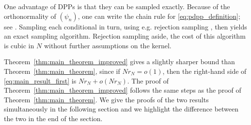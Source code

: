 \documentclass[twoside,11pt]{book}
\newtheorem{theorem}{Theorem}
\numberwithin{theorem}{chapter}
\numberwithin{definition}{chapter}
\numberwithin{proposition}{chapter}
\numberwithin{corollary}{chapter}
\numberwithin{example}{chapter}
\numberwithin{lemma}{chapter}
\begin{document}


One advantage of DPPs is that they can be sampled exactly. Because of the orthonormality of $(\psi_n)$, one can write the chain rule for \eqref{eq:pdpp_definition}; see \cite{HoKrPeVi06}. Sampling each conditional in turn, using e.g. rejection sampling \cite{RoCa04}, then yields an exact sampling algorithm. Rejection sampling aside, the cost of this algorithm is cubic in $N$ without further assumptions on the kernel. 

Theorem~\ref{thm:main_theorem_improved} gives a slightly sharper bound than Theorem~\ref{thm:main_theorem}, since if $Nr_{N} = o(1)$, then the right-hand side of \eqref{eq:main_result_first} is $N r_{N} + o(N r_{N})$. The proof of Theorem~\ref{thm:main_theorem_improved} follows the same steps as the proof of Theorem~\ref{thm:main_theorem}. We give the proofs of the two results simultaneously in the following section and we highlight the difference between the two in the end of the section.








\end{document}
